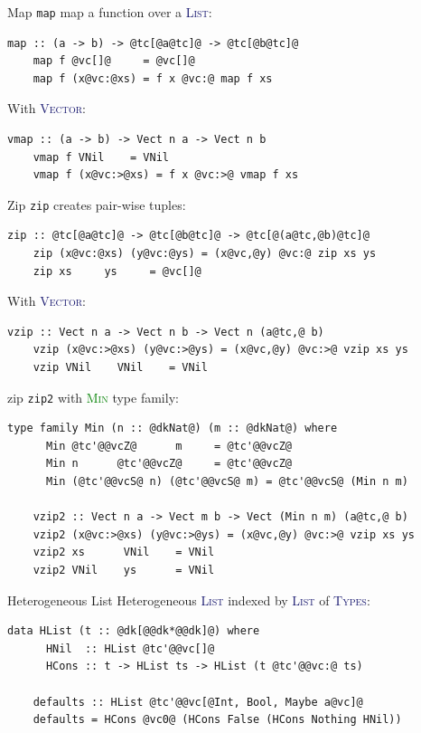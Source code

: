 \documentclass[xcolor={usenames,dvipsnames}]{beamer}
\newcommand{\htycon}[1]{\textcolor{MidnightBlue}{\textsc{#1}}}
\newcommand{\htyfam}[1]{\textcolor{Green}{\textsc{#1}}}
\begin{document}
\begin{frame}[fragile]{Map}
  \texttt{map} map a function over a \htycon{List}:
  \begin{lstlisting}[style=hask]
    map :: (a -> b) -> @tc[@a@tc]@ -> @tc[@b@tc]@
    map f @vc[]@     = @vc[]@
    map f (x@vc:@xs) = f x @vc:@ map f xs
  \end{lstlisting}

  \pause
  With \htycon{Vector}:
  \begin{lstlisting}[style=hask]
    vmap :: (a -> b) -> Vect n a -> Vect n b
    vmap f VNil    = VNil
    vmap f (x@vc:>@xs) = f x @vc:>@ vmap f xs
  \end{lstlisting}
\end{frame}

\begin{frame}[fragile]{Zip}
  \texttt{zip} creates pair-wise tuples:
  \begin{lstlisting}[style=hask]
    zip :: @tc[@a@tc]@ -> @tc[@b@tc]@ -> @tc[@(a@tc,@b)@tc]@
    zip (x@vc:@xs) (y@vc:@ys) = (x@vc,@y) @vc:@ zip xs ys
    zip xs     ys     = @vc[]@
  \end{lstlisting}

  \pause
  With \htycon{Vector}:
  \begin{lstlisting}[style=hask]
    vzip :: Vect n a -> Vect n b -> Vect n (a@tc,@ b)
    vzip (x@vc:>@xs) (y@vc:>@ys) = (x@vc,@y) @vc:>@ vzip xs ys
    vzip VNil    VNil    = VNil
  \end{lstlisting}
\end{frame}

\begin{frame}[fragile]{zip}
  \texttt{zip2} with \htyfam{Min} type family:
  \begin{lstlisting}[style=hask]
    type family Min (n :: @dkNat@) (m :: @dkNat@) where
      Min @tc'@@vcZ@      m     = @tc'@@vcZ@
      Min n      @tc'@@vcZ@     = @tc'@@vcZ@
      Min (@tc'@@vcS@ n) (@tc'@@vcS@ m) = @tc'@@vcS@ (Min n m)

    vzip2 :: Vect n a -> Vect m b -> Vect (Min n m) (a@tc,@ b)
    vzip2 (x@vc:>@xs) (y@vc:>@ys) = (x@vc,@y) @vc:>@ vzip xs ys
    vzip2 xs      VNil    = VNil
    vzip2 VNil    ys      = VNil
  \end{lstlisting}
\end{frame}

\begin{frame}[fragile]{Heterogeneous List}
  Heterogeneous \htycon{List} indexed by \htycon{List} of \htycon{Types}:
  \begin{lstlisting}[style=hask]
    data HList (t :: @dk[@@dk*@@dk]@) where
      HNil  :: HList @tc'@@vc[]@
      HCons :: t -> HList ts -> HList (t @tc'@@vc:@ ts)

    defaults :: HList @tc'@@vc[@Int, Bool, Maybe a@vc]@
    defaults = HCons @vc0@ (HCons False (HCons Nothing HNil))
  \end{lstlisting}
\end{frame}
\end{document}
